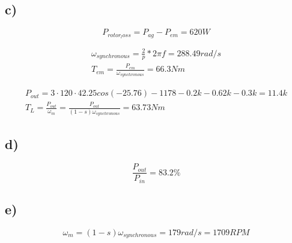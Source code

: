 \documentclass{article}
\begin{document}
    \subsection*{c)}
        \begin{equation*}
            P_{rotor_loss} = P_{ag} - P_{em} = \boxed{620W}
        \end{equation*}
    
        \begin{align*}
            \omega_{synchronous} = \frac{2}{p} * 2\pi f = 288.49 rad/s\\
            T_{em} = \frac{P_{em}}{\omega_{synchronous}} = \boxed{66.3Nm}
        \end{align*}

        \begin{align*}
            P_{out} = 3\cdot 120 \cdot 42.25 cos(-25.76) - 1178 - 0.2k - 0.62k - 0.3k = 11.4k\\
            T_{L} = \frac{P_{out}}{\omega_{m}} = \frac{P_{out}}{(1-s)\omega_{synchronous}} = 63.7 3Nm
        \end{align*}
    
    \subsection*{d)}
        \begin{equation*}
            \frac{P_{out}}{P_{in}} = 83.2\% 
        \end{equation*}


    \subsection*{e)}
        \begin{equation*}
            \omega_{m} = (1-s)\omega_{synchronous} = 179rad/s = 1709 RPM
        \end{equation*}
\end{document}
